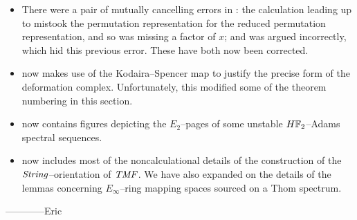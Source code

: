 \begin{itemize}
    \item There were a pair of mutually cancelling errors in : the calculation leading up to  mistook the permutation representation for the reduced permutation representation, and so was missing a factor of \(x\); and  was argued incorrectly, which hid this previous error.  These have both now been corrected.
    \item {} now makes use of the Kodaira--Spencer map to justify the precise form of the deformation complex.  Unfortunately, this modified some of the theorem numbering in this section.
    \item {} now contains figures depicting the \(E_2\)--pages of some unstable \(\HFtwo\)--Adams spectral sequences.
    \item {} now includes most of the noncalculational details of the construction of the \(\mathit{String}\)--orientation of \(\mathit{TMF}\).  We have also expanded on the details of the lemmas concerning \(E_\infty\)--ring mapping spaces sourced on a Thom spectrum.
\end{itemize}



\vspace{2\baselineskip}
\hspace{3em} ------------Eric




